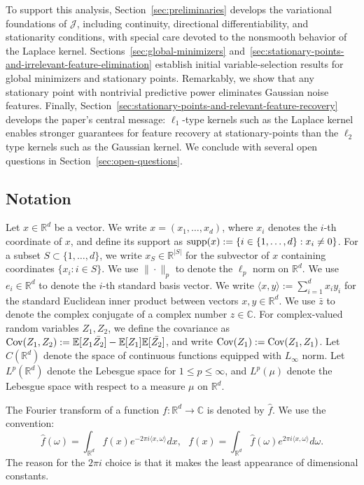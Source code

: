 \documentclass[sn-mathphys-num]{sn-jnl}%
\numberwithin{equation}{section}
\newcommand{\R}{\mathbb{R}}
\newcommand{\E}{\mathbb{E}}
\newcommand{\Cov}{{\rm Cov}}
\newcommand{\C}{\mathbb{C}}
\newcommand{\supp}{\mathop{\rm supp}}
\theoremstyle{thmstyleone}%
\theoremstyle{thmstyletwo}%
\theoremstyle{thmstylethree}%
\begin{document}
{To support this analysis, Section~\ref{sec:preliminaries} develops the variational foundations of $\mathcal{J}$, including continuity, directional differentiability, and stationarity conditions, with special care devoted to the nonsmooth behavior of the Laplace kernel. Sections~\ref{sec:global-minimizers} and~\ref{sec:stationary-points-and-irrelevant-feature-elimination} establish initial variable-selection results for global minimizers and stationary points. Remarkably, we show that any stationary point with nontrivial predictive power eliminates Gaussian noise features. Finally, Section~\ref{sec:stationary-points-and-relevant-feature-recovery} develops the paper's central message: $\ell_1$-type kernels such as the Laplace kernel enables stronger guarantees for feature recovery at stationary-points than the $\ell_2$ type kernels such as the Gaussian kernel. We conclude with several open questions in Section~\ref{sec:open-questions}.
}



\subsection{Notation} 
Let \( x \in \R^d \) be a vector. We write \( x = (x_1, \ldots, x_d) \), where \( x_i \) denotes the \(i\)-th coordinate of \(x\), and define its support as \( \supp(x) := \{ i \in \{1, \ldots, d\} : x_i \ne 0 \} \). For a subset \( S \subset \{1, \ldots, d\} \), we write \( x_S \in \R^{|S|} \) for the subvector of \( x \) containing coordinates \( \{x_i : i \in S\} \). We use \( \| \cdot \|_p \) to denote the \( \ell_p \) norm on \( \R^d \).  We use \( e_i \in \R^d \) to denote the \(i\)-th standard basis vector.  We write $\langle x, y \rangle:= \sum_{i=1}^d x_i y_i$ for the standard Euclidean inner product between vectors $x, y \in \R^d$. We use $\bar{z}$ to denote the complex conjugate of a complex number $z \in \C$. For complex-valued random variables $Z_1, Z_2$, we define the covariance as $\Cov(Z_1, Z_2) := \E[Z_1 \bar{Z_2}] -\E[Z_1] \E[\bar{Z_2}]$, and write $\Cov(Z_1):=\Cov(Z_1, Z_1)$. 
Let $C(\R^d)$ denote the space of continuous functions equipped with $L_\infty$ norm. Let $L^p(\R^d)$ denote the Lebesgue space for $1 \le p \le \infty$, and $L^p(\mu)$ denote the Lebesgue space with respect to a measure $\mu$ on $\R^d$.

The Fourier transform of a function \( f : \R^d \to \C \) is denoted by \( \hat{f} \). We use the convention:
\begin{equation*}
	\hat{f}(\omega) = \int_{\R^d} f(x) e^{-2\pi i\langle x, \omega\rangle} dx,~~~f(x) = \int_{\R^d} \hat{f}(\omega) e^{2\pi i \langle x, \omega \rangle} d\omega. 
\end{equation*} 
 The reason
for the $2\pi i$ choice is that it makes the least appearance of dimensional
constants.
\end{document}
